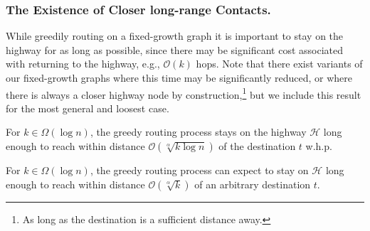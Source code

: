 \subsubsection{The Existence of Closer long-range Contacts.}
\label{sec:closer-contacts}
%
While greedily routing on a fixed-growth graph it is important to stay on the
highway for as long as possible, since there may be significant cost associated
with returning to the highway, e.g., $\mathcal{O}(k)$ hops.
Note that there exist variants of our fixed-growth graphs where this time may be
significantly reduced, or where there is always a closer highway node by
construction,\footnote{As long as the destination is a sufficient distance
away.} but we include this result for the most general and loosest case.
%
\vspace*{-\medskipamount}
\vspace*{-\medskipamount}
\begin{lemma} \label{lem:closer-contacts}
	For $k \in \Omega(\log{n})$, the greedy routing process stays on
	the highway $\mathcal{H}$ long enough to reach within distance
	$\mathcal{O}(\sqrt[\alpha]{k \log{n}})$ of the destination $t$ w.h.p.
\end{lemma}
%
\begin{corollary} \label{cor:closer-contacts-exp}
	For $k \in \Omega(\log{n})$, the greedy routing process can expect to stay
	on $\mathcal{H}$ long enough to reach within distance
	$\mathcal{O}(\sqrt[\alpha]{k})$ of an arbitrary destination $t$.
\end{corollary}
%
